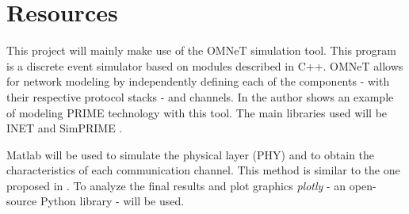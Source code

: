 
\section{Resources}

This project will mainly make use of the OMNeT \cite{omnet} simulation tool. This program is a discrete event simulator based on modules described in C++. OMNeT allows for network modeling by independently defining each of the components - with their respective protocol stacks - and channels. In \cite{prime_replicability} the author shows an example of modeling PRIME technology with this tool. The main libraries used will be INET \cite{inet} and SimPRIME \cite{simprime}.

Matlab will be used to simulate the physical layer (PHY) and to obtain the characteristics of each communication channel. This method is similar to the one proposed in \cite{tesis_jmatanza}. To analyze the final results and plot graphics \textit{plotly} - an open-source Python library - will be used.
